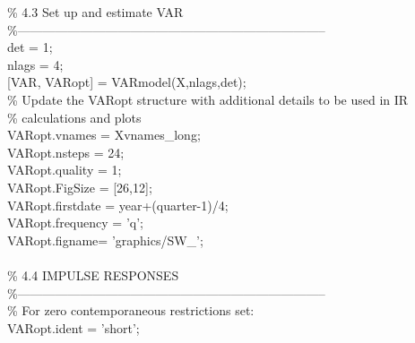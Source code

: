 \hspace{1mm}\textcolor{matlabgreen}{\% 4.3 Set up and estimate VAR }\\ 
\hspace{1mm}\textcolor{matlabgreen}{\%--------------------------------------------------------------------------  }\\ 
\hspace{1mm}det = 1; \\ 
\hspace{1mm}nlags = 4; \\ 
\hspace{1mm}[VAR, VARopt] = VARmodel(X,nlags,det); \\ 
\hspace{1mm}\textcolor{matlabgreen}{\% Update the VARopt structure with additional details to be used in IR  }\\ 
\hspace{1mm}\textcolor{matlabgreen}{\% calculations and plots }\\ 
\hspace{1mm}VARopt.vnames = Xvnames\_long; \\ 
\hspace{1mm}VARopt.nsteps = 24; \\ 
\hspace{1mm}VARopt.quality = 1; \\ 
\hspace{1mm}VARopt.FigSize = [26,12]; \\ 
\hspace{1mm}VARopt.firstdate = year+(quarter-1)/4; \\ 
\hspace{1mm}VARopt.frequency = \textcolor{matlabpurple}{'q'}; \\ 
\hspace{1mm}VARopt.figname= \textcolor{matlabpurple}{'graphics/SW\_'}; \\ 
\hspace{1mm} \\ 
\hspace{1mm}\textcolor{matlabgreen}{\% 4.4 IMPULSE RESPONSES }\\ 
\hspace{1mm}\textcolor{matlabgreen}{\%--------------------------------------------------------------------------  }\\ 
\hspace{1mm}\textcolor{matlabgreen}{\% For zero contemporaneous restrictions set: }\\ 
\hspace{1mm}VARopt.ident = \textcolor{matlabpurple}{'short'}; \\ 
